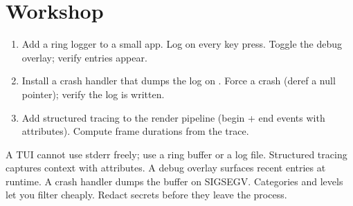 \section*{Workshop}

\begin{enumerate}[leftmargin=*]
  \item Add a ring logger to a small app. Log on every key
    press. Toggle the debug overlay; verify entries appear.
  \item Install a crash handler that dumps the log on
    . Force a crash (deref a null pointer);
    verify the log is written.
  \item Add structured tracing to the render pipeline (begin
    + end events with attributes). Compute frame durations
    from the trace.
\end{enumerate}

\begin{recap}
A TUI cannot use stderr freely; use a ring buffer or a log
file. Structured tracing captures context with attributes.
A debug overlay surfaces recent entries at runtime. A crash
handler dumps the buffer on SIGSEGV. Categories and levels
let you filter cheaply. Redact secrets before they leave the
process.
\end{recap}
